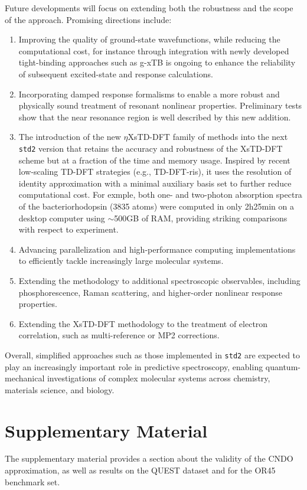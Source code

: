 \documentclass[%
 aip,
 amsmath,amssymb,
preprint,%
]{revtex4-2}
\begin{document}
Future developments will focus on extending both the robustness and the scope of the approach.  
Promising directions include:
\begin{enumerate}
	\item Improving the quality of ground-state wavefunctions, while reducing the computational cost, for instance through integration with newly developed tight-binding approaches such as g-xTB is ongoing to enhance the reliability of subsequent excited-state  and response calculations.
	\item Incorporating damped response formalisms to enable a more robust and physically sound treatment of resonant nonlinear properties.
	Preliminary tests show that the near resonance region is well described by this new addition.
	\item The introduction of the new $\eta$XsTD-DFT family of methods\cite{etaXS} into the next \texttt{std2} version that retains the accuracy and robustness of the XsTD-DFT scheme but at a fraction of the time and memory usage. Inspired by recent low-scaling TD-DFT strategies (e.g., TD-DFT-ris), it uses the resolution of identity approximation with a minimal auxiliary basis set to further reduce computational cost. For exmple, both one- and two-photon absorption spectra of the bacteriorhodopsin (3835 atoms) were computed in only 2h25min on a desktop computer using  $\sim$500GB of RAM, providing striking comparisons with respect to experiment.
	\item Advancing parallelization and high-performance computing implementations to efficiently tackle increasingly large molecular systems.
	\item Extending the methodology to additional spectroscopic observables, including phosphorescence, Raman scattering, and higher-order nonlinear response properties.
	\item Extending the XsTD-DFT methodology to the treatment of electron correlation, such as multi-reference or MP2 corrections.
\end{enumerate}

Overall, simplified approaches such as those implemented in \texttt{std2} are expected to play an increasingly important role in predictive spectroscopy, enabling quantum-mechanical investigations of complex molecular systems across chemistry, materials science, and biology.

\section*{Supplementary Material}
The supplementary material provides a section about the validity of the CNDO approximation, as well as results on the QUEST dataset and for the OR45 benchmark set.
\end{document}
